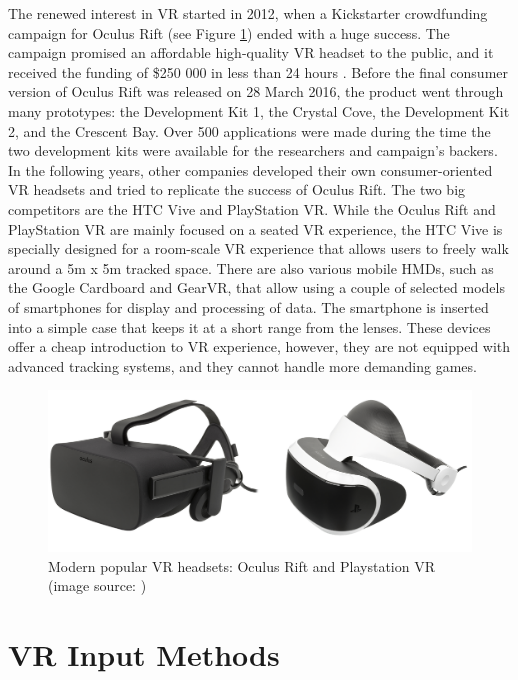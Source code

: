 The renewed interest in VR started in 2012, when a Kickstarter crowdfunding campaign for Oculus Rift (see Figure \ref{fig:CONTROLLERS}) ended with a huge success. The campaign promised an affordable high-quality VR headset to the public, and it received the funding of \$250 000 in less than 24 hours \cite{VR_TECHNOLOGY}. Before the final consumer version of Oculus Rift was released on 28 March 2016, the product went through many prototypes: the Development Kit 1, the Crystal Cove, the Development Kit 2, and the Crescent Bay. Over 500 applications were made during the time the two development kits were available for the researchers and campaign's backers. In the following years, other companies developed their own consumer-oriented VR headsets and tried to replicate the success of Oculus Rift. The two big competitors are the HTC Vive and PlayStation VR. While the Oculus Rift and PlayStation VR are mainly focused on a seated VR experience, the HTC Vive is specially designed for a room-scale VR experience that allows users to freely walk around a 5m x 5m tracked space. There are also various mobile HMDs, such as the Google Cardboard and GearVR, that allow using a couple of selected models of smartphones for display and processing of data. The smartphone is inserted into a simple case that keeps it at a short range from the lenses. These devices offer a cheap introduction to VR experience, however, they are not equipped with advanced tracking systems, and they cannot handle more demanding games.

\begin{figure}[th]
\centering
\includegraphics[width=1\textwidth]{img/headsets.png}
\caption{Modern popular VR headsets: Oculus Rift and Playstation VR (image source: \cite{OCULUS_HEADSET}\cite{PSVR_HEADSET})}
\label{fig:CONTROLLERS}
\end{figure}

\section{VR Input Methods}

